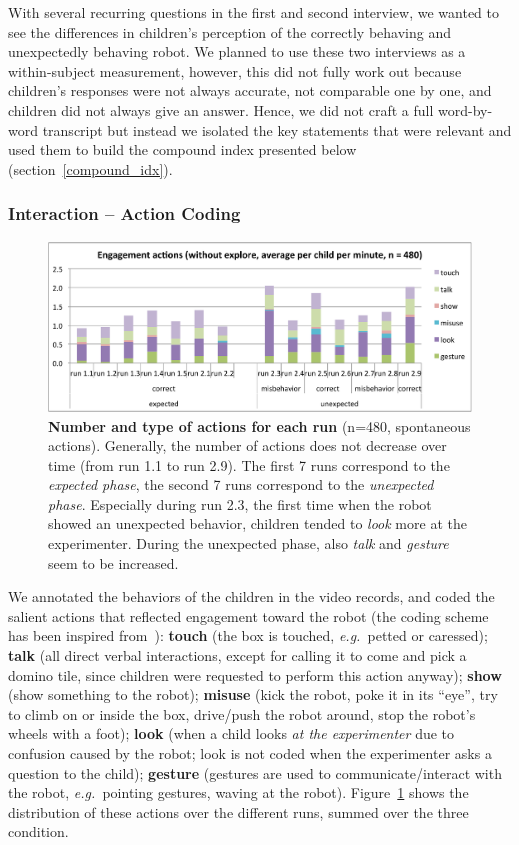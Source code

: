 \documentclass[letterpaper, 10pt, conference]{ieeeconf}
\newcommand{\eg}{{\textit{e.g.~}}}
\begin{document}
With several recurring questions in the first and second interview, we wanted to
see the differences in children's perception of the correctly behaving and
unexpectedly behaving robot. We planned to use these two interviews as a
within-subject measurement, however, this did not fully work out because
children's responses were not always accurate, not comparable one by one, and
children did not always give an answer. Hence, we did not craft a full
word-by-word transcript but instead we isolated the key statements that were
relevant and used them to build the compound index presented below
(section~\ref{compound_idx}).

\subsubsection{Interaction -- Action Coding}

\begin{figure}[ht!] 
    \centering 
    \includegraphics[width=0.8\linewidth]{domino-time-active.pdf} 
    \caption{\small \textbf{Number and type of actions for each run} (n=480,
        spontaneous actions). Generally, the number of
        actions does not decrease over time (from run 1.1 to run 2.9).  The
        first 7 runs correspond to the \textit{expected phase}, the second 7
        runs correspond to the \textit{unexpected phase}. Especially during run
        2.3, the first time when the robot showed an unexpected behavior,
        children tended to \textit{look} more at the experimenter. During the
        unexpected phase, also \textit{talk} and \textit{gesture} seem to be
        increased.}
    \label{fig:domino-time-active} 
\end{figure}

We annotated the behaviors of the children in the video records, and coded the
salient actions that reflected engagement toward the robot (the coding scheme has
been inspired from~\cite{fink2014which}): \textbf{touch} (the box is touched,
\eg petted or caressed); \textbf{talk} (all direct verbal interactions, except
for calling it to come and pick a domino tile, since children were requested to
perform this action anyway); \textbf{show} (show something to the robot);
\textbf{misuse} (kick the robot, poke it in its ``eye'', try to climb on or
inside the box, drive/push the robot around, stop the robot's wheels with a
foot); \textbf{look} (when a child looks \emph{at the experimenter} due to
confusion caused by the robot; look is not coded when the experimenter asks a
question to the child); \textbf{gesture} (gestures are used to
communicate/interact with the robot, \eg pointing gestures, waving at the
robot). Figure~\ref{fig:domino-time-active} shows the distribution of these
actions over the different runs, summed over the three condition.
\end{document}
